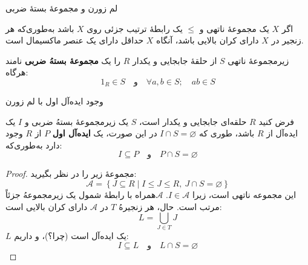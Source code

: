 \begin{frame}[t]{لم زورن و مجموعهٔ بستهٔ ضربی}
    \begin{theorem}[لِم زورن]
        اگر $X$ یک مجموعهٔ ناتهی و $\leq$ یک رابطهٔ ‌ترتیب جزئی روی $X$ باشد به‌طوری‌که
        هر زنجیر در $X$ دارای کران بالایی باشد، آنگاه $X$ حداقل دارای یک عنصر ماکسیمال است.
    \end{theorem}


    \begin{definition}
        زیرمجموعهٔ ناتهی $S$ از حلقهٔ جابجایی و یکدار $R$ را یک \textbf{مجموعهٔ بستهُ ضربی} نامند هرگاه:
        \[
            1_R \in S \quad \text{و} \quad \forall a, b \in S; \quad ab \in S
        \]
    \end{definition}

\end{frame}

\begin{frame}[t]{وجود ایده‌آل اول با لم زورن}
    \setlength{\abovedisplayskip}{3pt}
    \setlength{\belowdisplayskip}{3pt}
    \begin{theorem}
        فرض کنید $R$ حلقه‌ای جابجایی و یکدار است، $S$ یک زیرمجموعهٔ بستهُ ضربی و $I$ یک ایده‌آل از $R$ باشد، طوری که \(I \cap S = \varnothing\)
        در این صورت، یک \textbf{ایده‌آل اول} $P$ از $R$ وجود دارد به‌طوری‌که:
        \[
            I \subseteq P \quad \text{و} \quad P \cap S = \varnothing
        \]
    \end{theorem}

    \begin{proof}
        مجموعهٔ زیر را در نظر بگیرید:
        \[
            \mathcal{A} = \left\{ J \subseteq R \mid I \leqslant J \leqslant R, \ J \cap S = \varnothing \right\}
        \]
        این مجموعه ناتهی است، زیرا $I \in \mathcal{A}$.
        $\mathcal{A}$همراه با رابطهٔ شمول یک زیرمجموعهُ جزئاً مرتب است.
        حال، هر زنجیرهُ $T$ در $\mathcal{A}$ دارای کران بالایی است:
        \[
            L = \bigcup_{J \in T} J
        \]
        $L$ یک ایده‌آل است (چرا؟)، و داریم:
        \[
            I \subseteq L \quad \text{و} \quad L \cap S = \varnothing
        \]

    \end{proof}


\end{frame}


